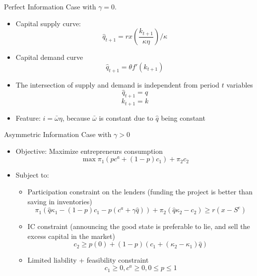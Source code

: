 \documentclass[11pt,aspectratio=169,xcolor={dvipsnames},hyperref={pdftex,pdfpagemode=UseNone,hidelinks,pdfdisplaydoctitle=true},usepdftitle=false]{beamer}
\begin{document}
\begin{frame}{Perfect Information}
Case with $\gamma = 0$. 
\begin{itemize}
\item Capital supply curve:
\[\hat{q}_{t+1} =  r x\left(\frac{k_{t+1}}{\kappa \eta} \right) /\kappa \]
\item Capital demand curve
\[\hat{q}_{t+1} = \theta f'(k_{t+1}) \]
\item The intersection of supply and demand is independent from period $t$ variables
\[\hat{q}_{t+1} = q\] \[k_{t+1} = k\]
\item Feature:  $i = \bar{\omega} \eta$, because $\bar{\omega}$ is constant due to $\hat{q}$ being constant
\end{itemize}
\end{frame}


\begin{frame}{Asymmetric Information}
Case with $\gamma > 0$
\begin{itemize}
\item Objective: Maximize entrepreneurs consumption
\[ \max \pi_1(p c^a + (1-p)c_1) +\pi_2 c_2\]
\item Subject to:
\begin{itemize}
\item Participation constraint on the lenders (funding the project is better than saving in inventories)
\[\pi_1 (\hat{q}\kappa_1 - (1-p) c_1 - p(c^a + \gamma \hat{q}) )+ \pi_2 (\hat{q} \kappa_2 - c_2) \geq r(x - S^e) \]
\item IC constraint (announcing the good state is preferable to lie, and sell the excess capital in the market)
\[c_2 \geq p(0) + (1-p) (c_1 + (\kappa_2 - \kappa_1) \hat{q}) \]
\item Limited liability + feasibility constraint
 \[c_1 \geq 0, c^a \geq 0, 0 \leq p \leq 1\]
\end{itemize}
\end{itemize}
\end{frame}
\end{document}

